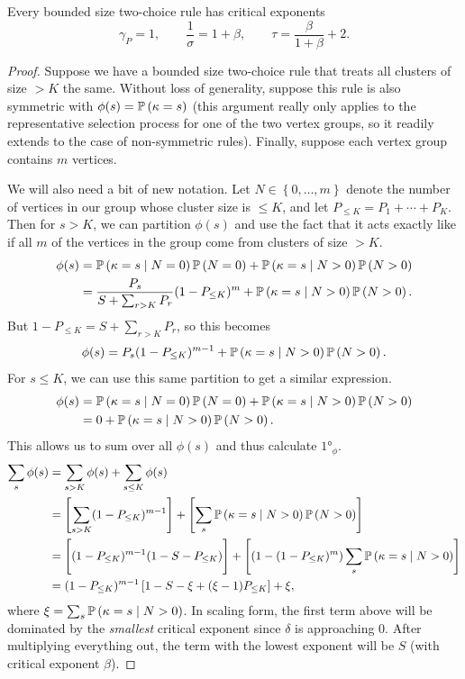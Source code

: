 \documentclass[twoside,10pt]{article}
\begin{document}
\begin{thrm}[]
Every bounded size two-choice rule has critical exponents
\[
	\gamma_{P}=1, \qquad \frac{1}{\sigma} =1+\beta, \qquad \tau = \frac{\beta}{1+\beta} +2.
\]
\end{thrm}
\begin{proof}
	Suppose we have a bounded size two-choice rule that treats all clusters of size $>K$ the same. Without loss of generality, suppose this rule is also symmetric with $\phi(s) = \P{ \kappa=s }$ (this argument really only applies to the representative selection process for one of the two vertex groups, so it readily extends to the case of non-symmetric rules). Finally, suppose each vertex group contains $m$ vertices.

	We will also need a bit of new notation. Let $N \in \left\{ 0, \dots, m \right\}$ denote the number of vertices in our group whose cluster size is $\leq K$, and let $P_{\leq K} = P_1 + \cdots + P_{K}$. Then for $s>K$, we can partition $\phi(s)$ and use the fact that it acts exactly like \ER if all $m$ of the vertices in the group come from clusters of size $> K$.
	\begin{align*}
		\phi(s) &= \P{ \kappa = s \;|\; N = 0}\P{ N=0 } + \P{ \kappa = s \;|\; N>0 } \P{ N>0 } \\
			&= \frac{P_{s}}{S + \sum_{r>K}P_{r}} (1-P_{\leq K})^{m} + \P{ \kappa = s \;|\; N>0 } \P{ N>0 }.
	\end{align*}
	But $1-P_{\leq K} = S + \sum_{r>K}P_{r}$, so this becomes
	\[
		\phi(s) = P_{s}(1-P_{\leq K})^{m-1} + \P{ \kappa = s \;|\; N>0 } \P{ N>0 }.
	\]
	For $s \leq K$, we can use this same partition to get a similar expression.
	\begin{align*}
		\phi(s) &= \P{ \kappa = s \;|\; N = 0}\P{ N=0 } + \P{ \kappa = s \;|\; N>0 } \P{ N>0 } \\
			&= 0 + \P{ \kappa = s \;|\; N>0 } \P{ N>0 }.
	\end{align*}
	This allows us to sum over all $\phi(s)$ and thus calculate $\ang{1}_{\phi}$.
	\begin{align*}
		\sum_{s} \phi(s) &= \sum_{s > K} \phi(s) + \sum_{ s \leq K}\phi(s) \\
				 &= \left[ \sum_{s>K}(1-P_{\leq K})^{m-1} \right] + \left[ \sum_{s} \P{ \kappa=s\;|\; N>0 }\P{ N>0 } \right] \\
				 &= \Bigg[ (1-P_{\leq K})^{m-1}(1-S-P_{\leq K}) \Bigg] + \left[ (1-(1-P_{\leq K})^{m}) \sum_{s} \P{ \kappa=s\;|\; N>0 } \right] \\
				 &= (1- P_{\leq K})^{m-1} \left[ 1 - S - \xi + (\xi-1)P_{\leq K} \right] + \xi,
	\end{align*}
	where $\xi = \sum_{s} \P{ \kappa=s\;|\; N>0 }$. In scaling form, the first term above will be dominated by the \emph{smallest} critical exponent since $\delta$ is approaching 0. After multiplying everything out, the term with the lowest exponent will be $S$ (with critical exponent $\beta$).


\end{proof}
\end{document}
